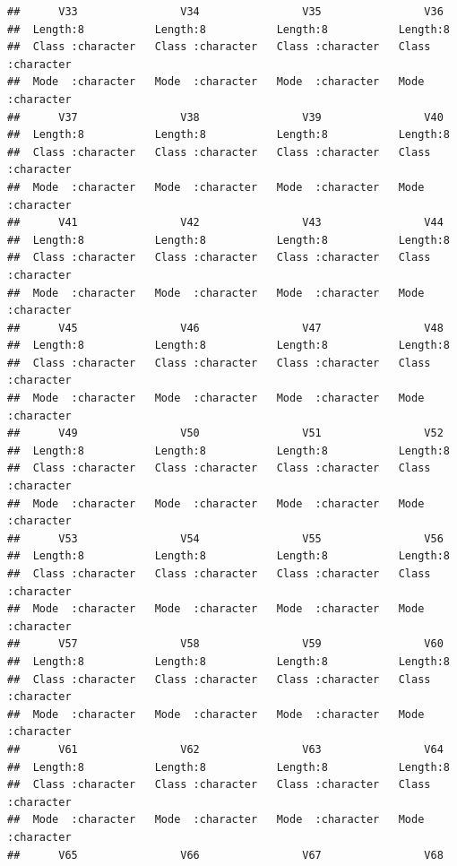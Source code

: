\documentclass[
]{article}
\begin{document}
\begin{verbatim}
##      V33                V34                V35                V36           
##  Length:8           Length:8           Length:8           Length:8          
##  Class :character   Class :character   Class :character   Class :character  
##  Mode  :character   Mode  :character   Mode  :character   Mode  :character  
##      V37                V38                V39                V40           
##  Length:8           Length:8           Length:8           Length:8          
##  Class :character   Class :character   Class :character   Class :character  
##  Mode  :character   Mode  :character   Mode  :character   Mode  :character  
##      V41                V42                V43                V44           
##  Length:8           Length:8           Length:8           Length:8          
##  Class :character   Class :character   Class :character   Class :character  
##  Mode  :character   Mode  :character   Mode  :character   Mode  :character  
##      V45                V46                V47                V48           
##  Length:8           Length:8           Length:8           Length:8          
##  Class :character   Class :character   Class :character   Class :character  
##  Mode  :character   Mode  :character   Mode  :character   Mode  :character  
##      V49                V50                V51                V52           
##  Length:8           Length:8           Length:8           Length:8          
##  Class :character   Class :character   Class :character   Class :character  
##  Mode  :character   Mode  :character   Mode  :character   Mode  :character  
##      V53                V54                V55                V56           
##  Length:8           Length:8           Length:8           Length:8          
##  Class :character   Class :character   Class :character   Class :character  
##  Mode  :character   Mode  :character   Mode  :character   Mode  :character  
##      V57                V58                V59                V60           
##  Length:8           Length:8           Length:8           Length:8          
##  Class :character   Class :character   Class :character   Class :character  
##  Mode  :character   Mode  :character   Mode  :character   Mode  :character  
##      V61                V62                V63                V64           
##  Length:8           Length:8           Length:8           Length:8          
##  Class :character   Class :character   Class :character   Class :character  
##  Mode  :character   Mode  :character   Mode  :character   Mode  :character  
##      V65                V66                V67                V68           

\end{verbatim}
\end{document}
